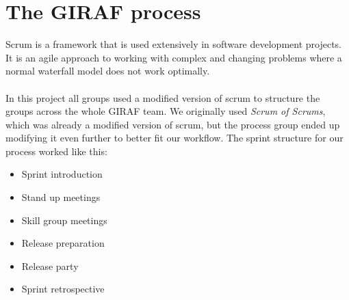 \section{The GIRAF process}\label{the-giraf-process}
Scrum is a framework that is used extensively in software development projects.
It is an agile approach to working with complex and changing problems where a normal waterfall model does not work optimally.
\\\\
In this project all groups used a modified version of scrum to structure the groups across the whole GIRAF team.
We originally used \textit{Scrum of Scrums}, which was already a modified version of scrum, but the process group ended up modifying it even further to better fit our workflow.
The sprint structure for our process worked like this:

\begin{itemize}
    \item Sprint introduction
    \item Stand up meetings
    \item Skill group meetings
    \item Release preparation
    \item Release party
    \item Sprint retrospective
\end{itemize}

